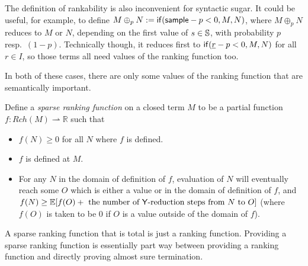 The definition of rankability is also inconvenient for syntactic sugar. It could be useful, for example, to define $M \oplus_p N := \mathsf{if}(\mathsf{sample} - p < 0, M, N)$, where $M \oplus_p N$ reduces to $M$ or $N$, depending on the first value of $s \in {\mathbb{S}}$, with probability $p$ resp.~$(1-p)$. Technically though, it reduces first to $\mathsf{if}(\underline r - p < 0, M, N)$ for all $r \in I$, so those terms all need values of the ranking function too.

In both of these cases, there are only some values of the ranking function that are semantically important. 
\begin{definition}
Define a \emph{sparse ranking function} on a closed term $M$ to be a partial function $f : Rch(M) \rightharpoonup \mathbb R$ such that
\begin{itemize}
    \item $f(N) \geq 0$ for all $N$ where $f$ is defined.
    \item $f$ is defined at $M$.
    \item For any $N$ in the domain of definition of $f$, evaluation of $N$ will eventually  reach some $O$ which is either a value or in the domain of definition of $f$, and $f(N) \geq \mathbb E[f(O) + \text{ the number of $\mathsf{Y}$-reduction steps from $N$ to $O$}]$ (where $f(O)$ is taken to be 0 if $O$ is a value outside of the domain of $f$).
\end{itemize}
\end{definition}
A sparse ranking function that is total is just a ranking function. Providing a sparse ranking function is essentially part way between providing a ranking function and directly proving almost sure termination.

